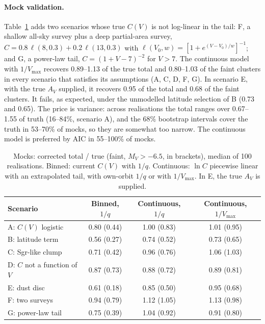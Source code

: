 \documentclass[11pt,a4paper]{article}
\newcommand{\MV}{M_V}
\begin{document}
\paragraph{Mock validation.} Table~\ref{tab:vmax_mock} adds two scenarios whose true $C(V)$ is not
log-linear in the tail: F, a shallow all-sky survey plus a deep partial-area survey,
$C = 0.8\,\ell(8,0.3) + 0.2\,\ell(13,0.3)$ with $\ell(V_0,w) = [1+e^{(V-V_0)/w}]^{-1}$; and G, a
power-law tail, $C = (1+V-7)^{-2}$ for $V>7$. The continuous model with $1/V_{\max}$ recovers 0.89--1.13
of the true total and 0.80--1.03 of the faint clusters in every scenario that satisfies its
assumptions (A, C, D, F, G). In scenario E, with the true $A_V$ supplied, it recovers 0.95 of the
total and 0.68 of the faint clusters. It fails, as expected, under the unmodelled latitude selection
of B (0.73 and 0.65). The price is variance: across realisations the total ranges over 0.67--1.55 of
truth (16--84\%, scenario A), and the 68\% bootstrap intervals cover the truth in 53--70\% of mocks,
so they are somewhat too narrow. The continuous model is preferred by AIC in 55--100\% of mocks.

\begin{table}[h]
\centering
\caption{Mocks: corrected total / true (faint, $\MV>-6.5$, in brackets), median of 100 realisations.
Binned: current $C(V)$ with $1/q$. Continuous: $\ln C$ piecewise linear with an extrapolated tail,
with own-orbit $1/q$ or with $1/V_{\max}$. In E, the true $A_V$ is supplied.}
\label{tab:vmax_mock}
\small\setlength{\tabcolsep}{4pt}
\begin{tabular}{lccc}
\toprule
Scenario & Binned, $1/q$ & Continuous, $1/q$ & Continuous, $1/V_{\max}$ \\
\midrule
A: $C(V)$ logistic & 0.80 (0.44) & 1.00 (0.83) & 1.01 (0.95) \\
B: latitude term & 0.56 (0.27) & 0.74 (0.52) & 0.73 (0.65) \\
C: Sgr-like clump & 0.71 (0.42) & 0.96 (0.76) & 1.06 (1.03) \\
D: $C$ not a function of $V$ & 0.87 (0.73) & 0.88 (0.72) & 0.89 (0.81) \\
E: dust disc & 0.61 (0.18) & 0.85 (0.50) & 0.95 (0.68) \\
F: two surveys & 0.94 (0.79) & 1.12 (1.05) & 1.13 (0.98) \\
G: power-law tail & 0.75 (0.39) & 1.04 (0.92) & 0.91 (0.80) \\
\bottomrule
\end{tabular}
\end{table}
\end{document}
